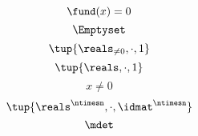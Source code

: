 {\begin{forslides}
\begin{equation}
    \end{equation}
    \begin{equation}
        \label{eq:quiz-4-def}
        \fund(x) = 0
    \end{equation}
    \begin{equation}
        \label{eq:emptyset}
        \Emptyset
    \end{equation}
    \begin{equation}
        \label{eq:nonzeroreals-times}
        \tup{\reals_{\neq0}, \cdot,  1}
    \end{equation}
    \begin{equation}
        \label{eq:reals-times-one}
        \tup{\reals, \cdot,  1}
    \end{equation}
    \begin{equation}
        \label{eq:reals-times-one-non}
        x \neq 0
    \end{equation}
    \begin{equation}
        \label{eq:matrices-times}
        \tup{\reals^{\ntimesn}, \cdot,  \idmat^{\ntimesn}}
    \end{equation}
    \begin{equation}
        \label{eq:det}
        \mdet
    \end{equation}

\end{forslides}

}